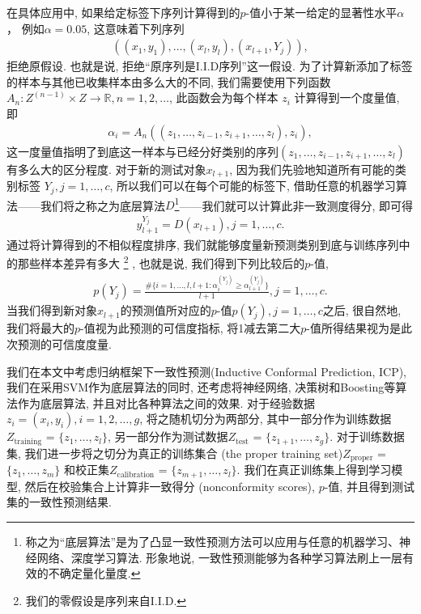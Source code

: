 在具体应用中, 如果给定标签下序列计算得到的$p$-值小于某一给定的显著性水平$\alpha$， 例如$\alpha = 0.05$, 这意味着下列序列
\begin{align*}
((x_1,y_1),\ldots,(x_l,y_l),(x_{l+1},Y_j)),
\end{align*}
拒绝原假设. 也就是说, 拒绝“原序列是I.I.D序列”这一假设. 为了计算新添加了标签的样本与其他已收集样本由多么大的不同, 我们需要使用下列函数 $A_{n}: Z^{(n-1)} \times Z \rightarrow \mathbb{R},n=1,2,\ldots$,  此函数会为每个样本 $z_{i}$ 计算得到一个度量值, 即
\begin{align}
\label{alpha}
\alpha_{i} = A_{n}((z_1,\ldots,z_{i-1},z_{i+1},\ldots,z_{l}), z_{i}),
\end{align}
这一度量值指明了到底这一样本与已经分好类别的序列$(z_{1},\ldots,z_{i-1},z_{i+1},\ldots,z_{l})$有多么大的区分程度. 对于新的测试对象$x_{l+1}$, 因为我们先验地知道所有可能的类别标签 $Y_{j},j=1,\ldots,c$, 所以我们可以在每个可能的标签下, 借助任意的机器学习算法——我们将之称之为底层算法$D$\footnote{称之为“底层算法”是为了凸显一致性预测方法可以应用与任意的机器学习、神经网络、深度学习算法. 形象地说, 一致性预测能够为各种学习算法刷上一层有效的不确定量化量度.}——我们就可以计算此非一致测度得分, 即可得
\begin{align}
y_{l+1}^{Y_{j}} = D(x_{l+1}), j = 1,\ldots,c.
\end{align}
通过将计算得到的不相似程度排序, 我们就能够度量新预测类别到底与训练序列中的那些样本差异有多大
\footnote{我们的零假设是序列来自I.I.D.}
, 也就是说, 我们得到下列比较后的$p$-值,
\begin{align}\label{align:pvalue}
p(Y_{j}) = \frac{\#\{i=1,\ldots,l,l+1: \alpha_{i}^{(Y_j)} \geq \alpha_{l+1}^{(Y_{j})}\}}{l+1},j=1,\ldots,c.
\end{align}
当我们得到新对象$x_{l+1}$的预测值所对应的$p$-值$p(Y_{j}), j=1,\ldots,c$之后, 很自然地, 我们将最大的$p$-值视为此预测的可信度指标, 将1减去第二大$p$-值所得结果视为是此次预测的可信度度量.

我们在本文中考虑归纳框架下一致性预测(Inductive Conformal Prediction, ICP), 我们在采用SVM作为底层算法的同时, 还考虑将神经网络, 决策树和Boosting等算法作为底层算法, 并且对比各种算法之间的效果. 对于经验数据$z_{i} = (x_{i}, y_{i}), i = 1,2,\ldots, g$, 将之\textsf{随机切分}为两部分, 其中一部分作为训练数据\textsf{$Z_{\text{training}}$} = $\{z_{1},\ldots,z_{l}\}$, 另一部分作为测试数据\textsf{$Z_{\text{test}}$} = $\{z_{1+1},\ldots,z_{g}\}$. 对于训练数据集, 我们进一步将之切分为真正的训练集合 (the proper training set)\textsf{$Z_{\text{proper}}$} = $\{z_{1},\ldots,z_{m}\}$ 和校正集\textsf{$Z_{\text{calibration}}$} = $\{z_{m+1},\ldots,z_{l}\}$. 我们在真正训练集上得到学习模型, 然后在校验集合上计算非一致得分 (nonconformity scores), $p$-值, 并且得到测试集的一致性预测结果. 

